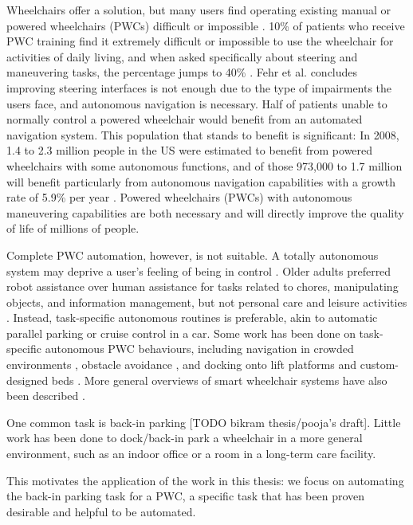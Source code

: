 Wheelchairs offer a solution, but many users find operating existing manual or
powered wheelchairs (PWCs) difficult or impossible \cite{simpson2008many}.
10\% of patients who receive PWC training find it extremely difficult or
impossible to use the wheelchair for activities of daily living, and
when asked specifically about steering and maneuvering tasks, the
percentage jumps to 40\% \cite{fehr2000adequacy}.
Fehr et al. \cite{fehr2000adequacy} concludes improving steering interfaces is
not enough due to the type of impairments the users face, and autonomous
navigation is necessary. Half of patients unable to normally control a powered
wheelchair would benefit from an automated navigation system.
This population that stands to benefit is significant:
In 2008, 1.4 to 2.3 million people in the US were estimated to
benefit from powered wheelchairs with some autonomous functions, and of those
973,000 to 1.7 million will benefit particularly from autonomous
navigation capabilities with a growth rate of 5.9\% per year \cite{simpson2008many}.
Powered wheelchairs (PWCs) with autonomous maneuvering capabilities are both
necessary and will directly improve the quality of life of millions of people.

Complete PWC automation, however, is not suitable. 
A totally autonomous system may deprive a user's feeling of being in control 
\cite{viswanathana2014wizard}.
Older adults preferred robot assistance over human assistance for tasks related
to chores, manipulating objects, and information management, but not personal
care and leisure activities \cite{smarr2014domestic}.
Instead, task-specific autonomous routines is preferable, akin to automatic
parallel parking or cruise control in a car.
Some work has been done on task-specific autonomous PWC behaviours, including
navigation in crowded environments \cite{prassler2001robotics}, obstacle
avoidance \cite{viswanathan2012navigation}, and docking onto lift platforms
\cite{sermeno2006vision} and custom-designed beds \cite{ren2012docking}.
More general overviews of smart wheelchair systems have also been described
\cite{viswanathan2012navigation, simpson2005smart, faria2013patient}. 

One common task is back-in parking [TODO bikram thesis/pooja's draft]. 
Little work has been done to dock/back-in park a wheelchair in a more general
environment, such as an indoor office or a room in a long-term care facility. 

This motivates the application of the work in this thesis:
we focus on automating the back-in parking task for a PWC, a specific task that
has been proven desirable and helpful to be automated.


